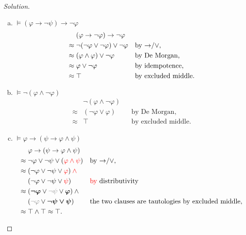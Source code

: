 \documentclass[letter]{article}
\theoremstyle{definition}
\newenvironment{solution}
{\begin{proof}[Solution]}
        {\end{proof}}
\renewcommand{\phi}{\varphi}
\begin{document}
\begin{solution}
\begin{enumerate}[(a)]
  \item $\models (\phi \to \neg \psi) \to \neg \phi$
\begin{align*}
  & (\phi \to \neg \phi) \to \neg \phi &&
\\ \approx{}
  & \neg (\neg \phi \vee \neg \phi) \vee \neg \phi
  && \text{by \tolor,}
\\ \approx{}
  & (\phi \wedge \phi) \vee \neg \phi
  && \text{by De Morgan,}
\\ \approx{}
  & \phi \lor \neg \phi
  && \text{by idempotence,}
\\ \approx{}
  & \top
  && \text{by excluded middle.}
\end{align*}

  \item $\models \neg (\phi \land \neg \phi)$
\begin{align*}
  & \neg (\phi \land \neg \phi) &&
\\ \approx{}
  & (\neg \phi \lor \phi)
  && \text{by De Morgan,}
\\ \approx{}
  & \top
  && \text{by excluded middle.}
\end{align*}

  \item $\models \phi \to (\psi \to \phi \land \psi)$
\begin{align*}
  & \phi \to (\psi \to \phi \land \psi) &&
\\ \approx{}
  & \neg \phi \lor \neg \psi \lor ({\color{red} \phi \land \psi})
  && \text{by \tolor,}
\\ \approx{}
    & (\neg \phi \lor \neg \psi \lor {\color{red}\phi}) \colop{red}{\land} {}
    &&
\\  & (\neg \phi \lor \neg \psi \lor {\color{red}\psi})
    && \text{\textcolor{red}{by} distributivity}
\\ \approx{}
    & (\bm{\neg \phi} \lor {\color{gray}\neg \psi} \lor \bm{\phi}) \land {}
    &&
\\  & ({\color{gray}\neg \phi} \lor \bm{\neg \psi \lor \psi})
    && \text{the two clauses are tautologies by excluded middle,}
\\ \approx{}
    & \top \wedge \top \approx \top.
    &&
\end{align*}


\end{enumerate}
\end{solution}
\end{document}
